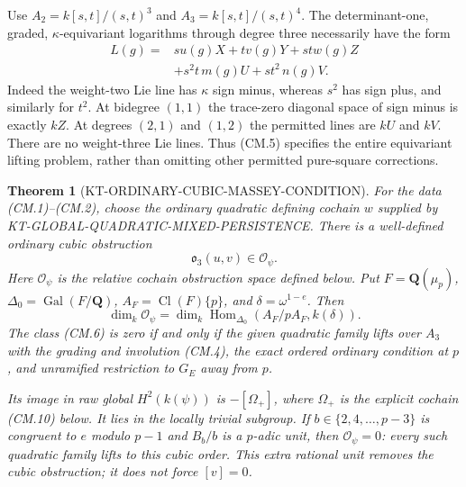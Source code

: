 \documentclass[11pt,a4paper]{article}
\newtheorem{theorem}{Theorem}[section]
\theoremstyle{definition}
\begin{document}
Use $A_2=k[s,t]/(s,t)^3$ and $A_3=k[s,t]/(s,t)^4$.
The determinant-one, graded, $\kappa$-equivariant logarithms
through degree three necessarily have the form
\[
\begin{split}
 L(g)={}&s u(g)X+t v(g)Y+st w(g)Z\\
        &+s^2t\,m(g)U+st^2\,n(g)V.
\end{split}                                                   \tag{CM.5}
\]
Indeed the weight-two Lie line has $\kappa$ sign minus,
whereas $s^2$ has sign plus, and similarly for $t^2$.
At bidegree $(1,1)$ the trace-zero diagonal space of sign minus
is exactly $kZ$.  At degrees $(2,1)$ and $(1,2)$ the permitted
lines are $kU$ and $kV$.  There are no weight-three Lie lines.
Thus (CM.5) specifies the entire equivariant lifting problem,
rather than omitting other permitted pure-square corrections.

\begin{theorem}[KT-ORDINARY-CUBIC-MASSEY-CONDITION]
For the data (CM.1)--(CM.2), choose the ordinary quadratic
defining cochain $w$ supplied by
KT-GLOBAL-QUADRATIC-MIXED-PERSISTENCE.  There is a well-defined
ordinary cubic obstruction
\[
                  \mathfrak o_3(u,v)\in\mathcal O_\psi.          \tag{CM.6}
\]
Here $\mathcal O_\psi$ is the relative cochain obstruction space
defined below.  Put $F=\mathbf Q(\mu_p)$,
$\Delta_0=\operatorname{Gal}(F/\mathbf Q)$,
$A_F=\operatorname{Cl}(F)\{p\}$, and $\delta=\omega^{1-e}$.
Then
\[
 \dim_k\mathcal O_\psi
   =\dim_k\operatorname{Hom}_{\Delta_0}
                         (A_F/pA_F,k(\delta)).                 \tag{CM.7}
\]
The class (CM.6) is zero if and only if the given quadratic
family lifts over $A_3$ with the grading and involution
(CM.4), the exact ordered ordinary condition at $p$, and
unramified restriction to $G_E$ away from $p$.

Its image in raw global $H^2(k(\psi))$ is
$-[\Omega_+]$, where $\Omega_+$ is the explicit cochain
(CM.10) below.  It lies in the locally trivial subgroup.
If $b\in\{2,4,\ldots,p-3\}$ is congruent to $e$ modulo $p-1$
and $B_b/b$ is a $p$-adic unit, then
$\mathcal O_\psi=0$: every such quadratic family lifts to
this cubic order.  This extra rational unit removes the cubic
obstruction; it does not force $[v]=0$.
\end{theorem}
\end{document}
